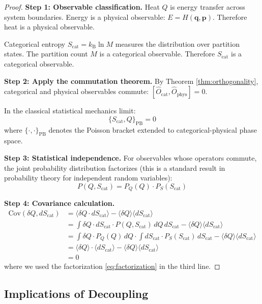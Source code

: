 \documentclass[twocolumn,10pt,twoside]{article}
\newcommand{\kb}{k_{\mathrm{B}}}
\newcommand{\Ocat}{\hat{O}_{\mathrm{cat}}}
\newcommand{\Ophys}{\hat{O}_{\mathrm{phys}}}
\newcommand{\Scat}{S_{\mathrm{cat}}}
\begin{document}
\begin{proof}
\textbf{Step 1: Observable classification.}
Heat $Q$ is energy transfer across system boundaries. Energy is a physical observable: $E = H(\mathbf{q}, \mathbf{p})$. Therefore heat is a physical observable.

Categorical entropy $\Scat = \kb \ln M$ measures the distribution over partition states. The partition count $M$ is a categorical observable. Therefore $\Scat$ is a categorical observable.

\textbf{Step 2: Apply the commutation theorem.}
By Theorem \ref{thm:orthogonality}, categorical and physical observables commute: $[\Ocat, \Ophys] = 0$.

In the classical statistical mechanics limit:
\begin{equation}
\{\Scat, Q\}_{\text{PB}} = 0
\end{equation}
where $\{\cdot, \cdot\}_{\text{PB}}$ denotes the Poisson bracket extended to categorical-physical phase space.

\textbf{Step 3: Statistical independence.}
For observables whose operators commute, the joint probability distribution factorizes (this is a standard result in probability theory for independent random variables):
\begin{equation}
P(Q, \Scat) = P_Q(Q) \cdot P_S(\Scat)
\label{eq:factorization}
\end{equation}

\textbf{Step 4: Covariance calculation.}
\begin{align}
\text{Cov}(\delta Q, d\Scat) &= \langle \delta Q \cdot d\Scat \rangle - \langle \delta Q \rangle \langle d\Scat \rangle \\
&= \int \delta Q \cdot d\Scat \cdot P(Q, \Scat) \, dQ \, d\Scat - \langle \delta Q \rangle \langle d\Scat \rangle \\
&= \int \delta Q \cdot P_Q(Q) \, dQ \cdot \int d\Scat \cdot P_S(\Scat) \, d\Scat - \langle \delta Q \rangle \langle d\Scat \rangle \\
&= \langle \delta Q \rangle \cdot \langle d\Scat \rangle - \langle \delta Q \rangle \langle d\Scat \rangle \\
&= 0
\end{align}
where we used the factorization \eqref{eq:factorization} in the third line.
\end{proof}

\subsection{Implications of Decoupling}
\end{document}
